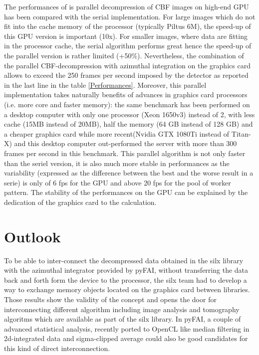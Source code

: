 \documentclass[preprint, pdf]{iucr}              %
\begin{document}
The performances of is parallel decompression of CBF images on high-end GPU has
been compared with the serial implementation. 
For large images which do not fit into the cache memory of the
processor (typically Piltus 6M), the speed-up of this GPU version is important (10x).
For smaller images, where data are fitting in the processor cache, the serial
algorithm performs great hence the speed-up of the parallel version is
rather limited (+50\%). 
Nevertheless, the combination of the parallel CBF-decompression with azimuthal
integration on the graphics card allows to exceed the 250 frames per second
imposed by the detector as reported in the last line in the table
\ref{Performances}.
Moreover, this parallel implementation takes naturally benefits of advances in
graphics card processors (i.e. more core and faster memory): 
the same benchmark has been performed on a desktop computer with only one
processor (Xeon 1650v3) instead of 2, with less cache (15MB instead of 20MB),
half the memory (64 GB instead of 128 GB) and a cheaper graphics card while more
recent(Nvidia GTX 1080Ti instead of Titan-X) and this desktop computer
out-performed the server with more than 300 frames per second in this benchmark.
This parallel algorithm is not only faster than the seriel version, it is also
much more stable in performances as the variability (expressed
as the difference between the best and the worse result in a serie) is
only of 6 fps for the GPU and above 20 fps for the pool of worker pattern. 
The stability of the performances on the GPU can be explained by the dedication
of the graphics card to the calculation.

\section{Outlook}

To be able to inter-connect the decompressed data obtained in the silx library
with the azimuthal integrator provided by pyFAI, without transferring the data
back and forth form the device to the processor, the silx team had to develop a
way to exchange memory objects located on the graphics card between libraries. 
Those results show the validity of the concept and opens the door for
interconnecting different algorithm including image analysis and
tomography algoritms which are available as part of the silx library.
In pyFAI, a couple of advanced statistical analysis, recently ported to
OpenCL like median filtering in 2d-integrated data and sigma-clipped
average could also be good candidates for this kind of direct interconnection.
\end{document}
